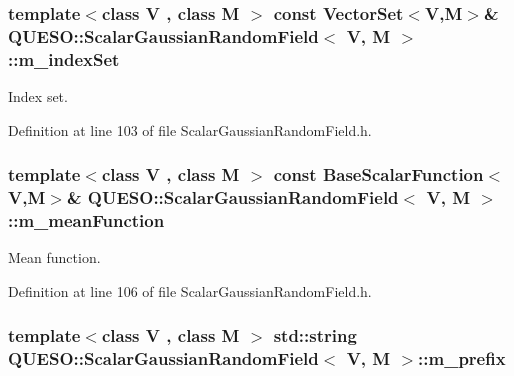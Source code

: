 \hypertarget{class_q_u_e_s_o_1_1_scalar_gaussian_random_field_ada3f607cbe463fd3f735e33acca3f132}{
\subsubsection[{m\-\_\-index\-Set}]{\setlength{\rightskip}{0pt plus 5cm}template$<$class V , class M $>$ const {\bf Vector\-Set}$<$V,M$>$\& {\bf Q\-U\-E\-S\-O\-::\-Scalar\-Gaussian\-Random\-Field}$<$ V, M $>$\-::m\-\_\-index\-Set\hspace{0.3cm}{\ttfamily [protected]}}}\label{class_q_u_e_s_o_1_1_scalar_gaussian_random_field_ada3f607cbe463fd3f735e33acca3f132}


Index set. 



Definition at line 103 of file Scalar\-Gaussian\-Random\-Field.\-h.

\hypertarget{class_q_u_e_s_o_1_1_scalar_gaussian_random_field_a89e14e481690ccfa5536352018c7641f}{
\subsubsection[{m\-\_\-mean\-Function}]{\setlength{\rightskip}{0pt plus 5cm}template$<$class V , class M $>$ const {\bf Base\-Scalar\-Function}$<$V,M$>$\& {\bf Q\-U\-E\-S\-O\-::\-Scalar\-Gaussian\-Random\-Field}$<$ V, M $>$\-::m\-\_\-mean\-Function\hspace{0.3cm}{\ttfamily [protected]}}}\label{class_q_u_e_s_o_1_1_scalar_gaussian_random_field_a89e14e481690ccfa5536352018c7641f}


Mean function. 



Definition at line 106 of file Scalar\-Gaussian\-Random\-Field.\-h.

\hypertarget{class_q_u_e_s_o_1_1_scalar_gaussian_random_field_a92b889ad0b3f05650afc60b3808af1b9}{
\subsubsection[{m\-\_\-prefix}]{\setlength{\rightskip}{0pt plus 5cm}template$<$class V , class M $>$ std\-::string {\bf Q\-U\-E\-S\-O\-::\-Scalar\-Gaussian\-Random\-Field}$<$ V, M $>$\-::m\-\_\-prefix\hspace{0.3cm}{\ttfamily [protected]}}}\label{class_q_u_e_s_o_1_1_scalar_gaussian_random_field_a92b889ad0b3f05650afc60b3808af1b9}


